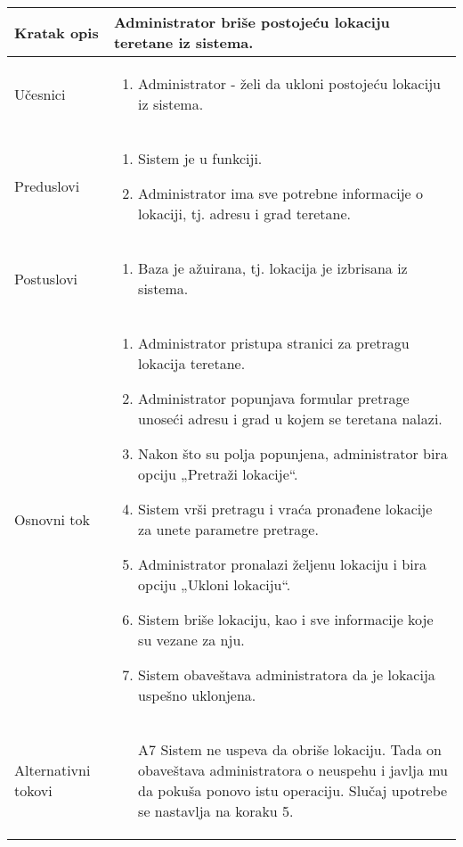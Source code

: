\documentclass[../main.tex]{subfiles}
\begin{document}
\begin{longtable}{| p{} | p{} |} 

\hline
    Kratak opis &  Administrator briše postojeću lokaciju teretane iz sistema.\\ 
\hline    
    Učesnici & 
    	\begin{enumerate}
        \item Administrator - želi da ukloni postojeću lokaciju iz sistema.
     \end{enumerate}\\
\hline
   Preduslovi & \begin{enumerate}
       \item Sistem je u funkciji.
       \item Administrator ima sve potrebne informacije o lokaciji, tj. adresu i grad teretane.
   \end{enumerate}\\
\hline  
    Postuslovi & \begin{enumerate}
        \item Baza je ažuirana, tj. lokacija je izbrisana iz sistema.
    \end{enumerate}\\
\hline
    Osnovni tok & \begin{enumerate}
        \item Administrator pristupa stranici za pretragu lokacija teretane.
        \item Administrator popunjava formular pretrage unoseći adresu i grad u kojem se teretana nalazi.
        \item Nakon što su polja popunjena, administrator bira opciju „Pretraži lokacije“.
        \item Sistem vrši pretragu i vraća pronađene lokacije za unete parametre pretrage.
        \item Administrator pronalazi željenu lokaciju i bira opciju „Ukloni lokaciju“.
        \item Sistem briše lokaciju, kao i sve informacije koje su vezane za nju.
        \item Sistem obaveštava administratora da je lokacija uspešno uklonjena.
    \end{enumerate}\\
\hline
    Alternativni tokovi & \begin{itemize}
        \item[A7]  Sistem ne uspeva da obriše lokaciju. Tada on obaveštava administratora o neuspehu i javlja mu da pokuša ponovo istu operaciju. Slučaj upotrebe se nastavlja na koraku 5.


\end{itemize}
\end{longtable}
\end{document}

